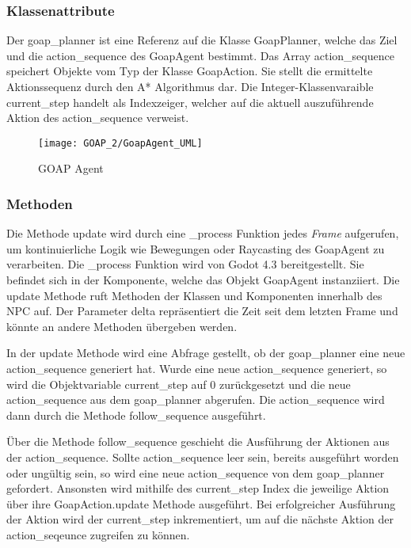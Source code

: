 \subsubsection{Klassenattribute}

Der goap\_planner ist eine Referenz auf die Klasse GoapPlanner, welche das Ziel und die action\_sequence des GoapAgent bestimmt. Das Array action\_sequence speichert Objekte vom Typ der Klasse GoapAction. Sie stellt die ermittelte Aktionssequenz durch den A* Algorithmus dar. Die Integer-Klassenvaraible current\_step handelt als Indexzeiger, welcher auf die aktuell auszuführende Aktion des action\_sequence verweist.

\begin{figure}[h]
  \centering
  \texttt{[image: GOAP\_2/GoapAgent\_UML]}
	\captionsetup{justification=justified, format=plain}
  \caption{GOAP Agent}
  \label{GOAP Agent}
\end{figure}


\subsubsection{Methoden}

Die Methode update wird durch eine \_process Funktion jedes \textit{Frame} aufgerufen, um kontinuierliche Logik wie Bewegungen oder Raycasting des GoapAgent zu verarbeiten. Die \_process Funktion wird von Godot 4.3 bereitgestellt. Sie befindet sich in der Komponente, welche das Objekt GoapAgent instanziiert. Die update Methode ruft Methoden der Klassen und Komponenten innerhalb des NPC auf. Der Parameter delta repräsentiert die Zeit seit dem letzten Frame und könnte an andere Methoden übergeben werden.



In der update Methode wird eine Abfrage gestellt, ob der goap\_planner eine neue action\_sequence generiert hat. Wurde eine neue action\_sequence generiert, so wird die Objektvariable current\_step auf $0$ zurückgesetzt und die neue action\_sequence aus dem goap\_planner abgerufen. Die action\_sequence wird dann durch die Methode follow\_sequence ausgeführt.

Über die Methode follow\_sequence geschieht die Ausführung der Aktionen aus der action\_sequence. Sollte action\_sequence leer sein, bereits ausgeführt worden oder ungültig sein, so wird eine neue action\_sequence von dem goap\_planner gefordert. Ansonsten wird mithilfe des current\_step Index die jeweilige Aktion über ihre GoapAction.update Methode ausgeführt. Bei erfolgreicher Ausführung der Aktion wird der current\_step inkrementiert, um auf die nächste Aktion der action\_seqeunce zugreifen zu können.

